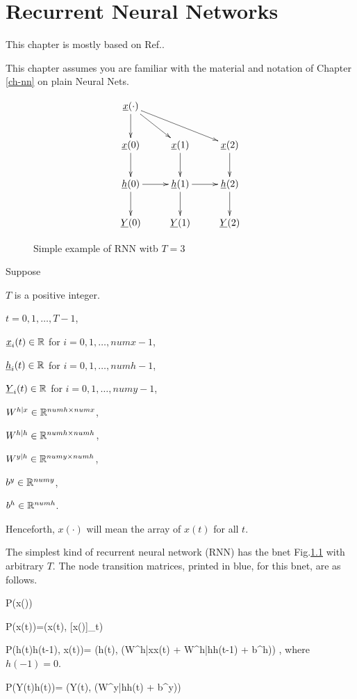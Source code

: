 \chapter{Recurrent Neural Networks}

This chapter is mostly
based on Ref.\cite{ng-rnn}.

This chapter
assumes you are
familiar 
with the material
and notation of Chapter \ref{ch-nn}
on plain Neural Nets.


\begin{figure}[h!]
\centering
$$\xymatrix{
\rvx(\cdot)\ar[d]\ar[dr]\ar[drr]\\
\rvx(0)\ar[d]&
\rvx(1)\ar[d]&
\rvx(2)\ar[d]\\
\rvh(0)\ar[d]\ar[r]&
\rvh(1)\ar[d]\ar[r]&
\rvh(2)\ar[d]\\
\rvY(0)&
\rvY(1)&
\rvY(2)
}$$
\caption{Simple example of 
RNN witb $T=3$}
\label{fig-rnn}
\end{figure}

Suppose

$T$ is a positive integer.

$t=0, 1, \ldots, T-1$,

${\underline{x}}_i(t)\in { \mathbb{R}}$ for
 $i=0,1, \ldots,numx-1$,

${\underline{h}}_i(t)\in { \mathbb{R}}$ for
 $i=0,1, \ldots,numh-1$,

${\underline{Y}}_i(t)\in { \mathbb{R}}$ for
 $i=0,1, \ldots,numy-1$,

$W^{h|x}\in{ \mathbb{R}}^{numh\times numx}$,

$W^{h|h}\in{ \mathbb{R}}^{numh\times numh}$,

$W^{y|h}\in{ \mathbb{R}}^{numy\times numh}$,

$b^y\in { \mathbb{R}}^{numy}$,

$b^h\in { \mathbb{R}}^{numh}$.

Henceforth, $x(\cdot)$ will
mean the array of $x(t)$ for all $t$.

The simplest kind of
recurrent neural network (RNN)
has
the bnet Fig.\ref{fig-rnn}
with arbitrary $T$.
The node
transition matrices, printed in
blue, for this bnet, are as follows.

\beq\color{blue}
P(x(\cdot))
\eeq

\beq\color{blue}
P(x(t))=\delta(x(t), [x(\cdot)]_t)
\eeq

\beq\color{blue}
P(h(t)\cond h(t-1), x(t))=
\delta(h(t),
\cala(W^{h|x}x(t) +
 W^{h|h}h(t-1) + b^h))
\;,
\eeq
where
$h(-1)=0$.

\beq\color{blue}
P(Y(t)\cond h(t))=
\delta(Y(t),
\cala(W^{y|h}h(t) + b^y))
\eeq

